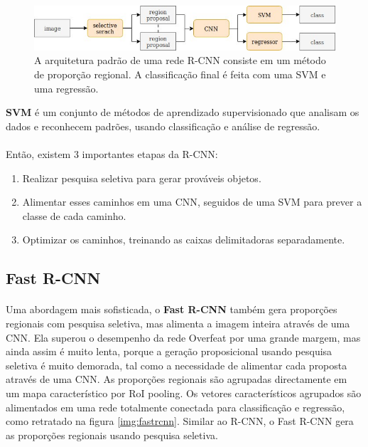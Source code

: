 \begin{figure}[h!]
  \label{img:rcnn}
  \includegraphics[width=1\textwidth]{rcnn.jpeg}
  \caption{A arquitetura padrão de uma rede \ac{R-CNN} consiste em um método de proporção regional. A classificação final é feita com uma \ac{SVM} e uma regressão.}
\end{figure}

\textbf{\ac{SVM}} é um conjunto de métodos de aprendizado supervisionado que analisam os dados e reconhecem padrões, usando classificação e análise de regressão.

\paragraph{}
Então, existem 3 importantes etapas da \ac{R-CNN}:

\begin{enumerate}
    \item Realizar pesquisa seletiva para gerar prováveis objetos.
    \item Alimentar esses caminhos em uma \ac{CNN}, seguidos de uma \ac{SVM} para prever a classe de cada caminho.
    \item Optimizar os caminhos, treinando as caixas delimitadoras separadamente.
\end{enumerate}

\subsection{Fast R-CNN}
\label{chap2:subsec:fastrcnn}

\paragraph{}
Uma abordagem mais sofisticada, o \textbf{Fast \ac{R-CNN}} também gera proporções regionais com pesquisa seletiva, mas alimenta a imagem inteira através de uma \ac{CNN}.
Ela superou o desempenho da rede Overfeat por uma grande margem, mas ainda assim é muito lenta, porque a geração proposicional usando pesquisa seletiva é muito demorada, tal como a necessidade de alimentar cada proposta através de uma \ac{CNN}. As proporções regionais são agrupadas directamente em um mapa característico por \ac{RoI} pooling. Os vetores característicos agrupados são alimentados em uma rede totalmente conectada para classificação e regressão, como retratado na figura \ref{img:fastrcnn}. Similar ao \ac{R-CNN}, o Fast \ac{R-CNN} gera as proporções regionais usando pesquisa seletiva.

